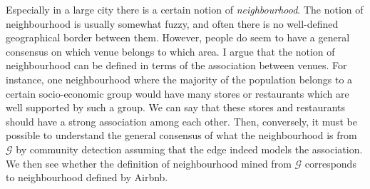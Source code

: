 Especially in a large city there is a certain notion of \emph{neighbourhood}. The notion of neighbourhood is usually somewhat fuzzy, and often there is no well-defined geographical border between them. However, people do seem to have a general consensus on which venue belongs to which area. I argue that the notion of neighbourhood can be defined in terms of the association between venues. For instance, one neighbourhood where the majority of the population belongs to a certain socio-economic group would have many stores or restaurants which are well supported by such a group. We can say that these stores and restaurants should have a strong association among each other. Then, conversely, it must be possible to understand the general consensus of what the neighbourhood is from $\mathcal{G}$ by community detection assuming that the edge indeed models the association. We then see whether the definition of neighbourhood mined from $\mathcal{G}$ corresponds to neighbourhood defined by Airbnb.
